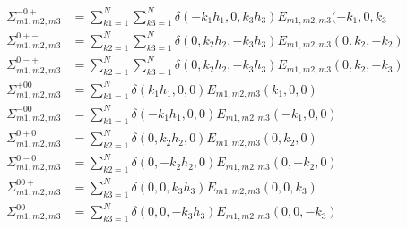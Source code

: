 \begin{align*}
\Sigma_{m1,m2,m3}^{-0+}&=\sum_{k1=1}^{N}\sum_{k3=1}^{N}\delta(-k_1h_1,0,k_3h_3) E_{m1,m2,m3}(-k_1,0,k_3\\
\Sigma_{m1,m2,m3}^{0+-}&=\sum_{k2=1}^{N}\sum_{k3=1}^{N}\delta(0, k_2h_2,-k_3h_3) E_{m1,m2,m3}(0, k_2,-k_2)\\
\Sigma_{m1,m2,m3}^{0-+}&=\sum_{k2=1}^{N}\sum_{k3=1}^{N}\delta(0, k_2h_2,-k_3h_3) E_{m1,m2,m3}(0, k_2,-k_3)\\
\Sigma_{m1,m2,m3}^{+00}&=\sum_{k1=1}^{N}\delta(k_1h_1,0,0) E_{m1,m2,m3}(k_1,0,0)\\
\Sigma_{m1,m2,m3}^{-00}&=\sum_{k1=1}^{N}\delta(-k_1h_1,0,0) E_{m1,m2,m3}(-k_1,0,0)\\
\Sigma_{m1,m2,m3}^{0+0}&=\sum_{k2=1}^{N}\delta(0,k_2h_2,0) E_{m1,m2,m3}(0,k_2,0)\\
\Sigma_{m1,m2,m3}^{0-0}&=\sum_{k2=1}^{N}\delta(0,-k_2h_2,0) E_{m1,m2,m3}(0,-k_2,0)\\
\Sigma_{m1,m2,m3}^{00+}&=\sum_{k3=1}^{N}\delta(0,0,k_3h_3) E_{m1,m2,m3}(0,0,k_3)\\
\Sigma_{m1,m2,m3}^{00-}&=\sum_{k3=1}^{N}\delta(0,0,-k_3h_3) E_{m1,m2,m3}(0,0,-k_3)
\end{align*}


